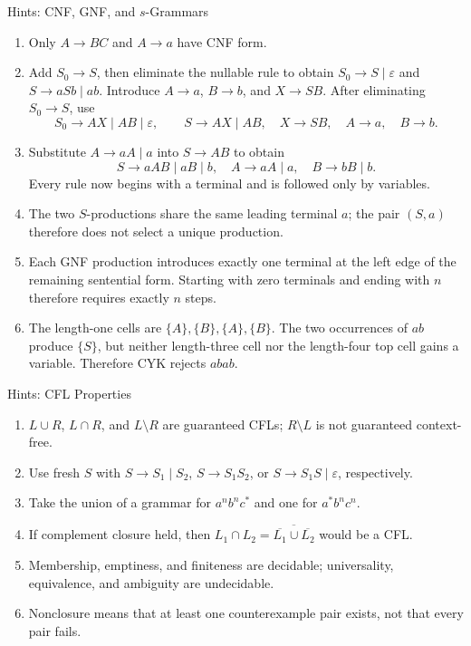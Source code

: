 \documentclass[10pt]{beamer}
\begin{document}
\begin{frame}{Hints: CNF, GNF, and $s$-Grammars}
  \small
  \begin{enumerate}
    \item Only $A\to BC$ and $A\to a$ have CNF form.
    \item Add $S_0\to S$, then eliminate the nullable rule to obtain
      $S_0\to S\mid\varepsilon$ and $S\to aSb\mid ab$. Introduce
      $A\to a$, $B\to b$, and $X\to SB$. After eliminating $S_0\to S$, use
      \[
        S_0\to AX\mid AB\mid\varepsilon,\qquad
        S\to AX\mid AB,\quad X\to SB,\quad A\to a,\quad B\to b.
      \]
    \item Substitute $A\to aA\mid a$ into $S\to AB$ to obtain
      \[
        S\to aAB\mid aB\mid b,\quad
        A\to aA\mid a,\quad B\to bB\mid b.
      \]
      Every rule now begins with a terminal and is followed only by variables.
    \item The two $S$-productions share the same leading terminal $a$; the
      pair $(S,a)$ therefore does not select a unique production.
    \item Each GNF production introduces exactly one terminal at the left edge
      of the remaining sentential form. Starting with zero terminals and ending
      with $n$ therefore requires exactly $n$ steps.
    \item The length-one cells are
      $\{A\},\{B\},\{A\},\{B\}$. The two occurrences of $ab$ produce
      $\{S\}$, but neither length-three cell nor the length-four top cell gains
      a variable. Therefore CYK rejects $abab$.
  \end{enumerate}
\end{frame}

\begin{frame}{Hints: CFL Properties}
  \small
  \begin{enumerate}
    \item $L\cup R$, $L\cap R$, and $L\setminus R$ are guaranteed CFLs;
      $R\setminus L$ is not guaranteed context-free.
    \item Use fresh $S$ with $S\to S_1\mid S_2$, $S\to S_1S_2$, or
      $S\to S_1S\mid\varepsilon$, respectively.
    \item Take the union of a grammar for $a^n b^n c^*$ and one for $a^*b^n c^n$.
    \item If complement closure held, then
      $L_1\cap L_2=\overline{\overline{L_1}\cup\overline{L_2}}$ would be a CFL.
    \item Membership, emptiness, and finiteness are decidable; universality, equivalence, and ambiguity are undecidable.
    \item Nonclosure means that at least one counterexample pair exists, not that every pair fails.
  \end{enumerate}
\end{frame}
\end{document}
